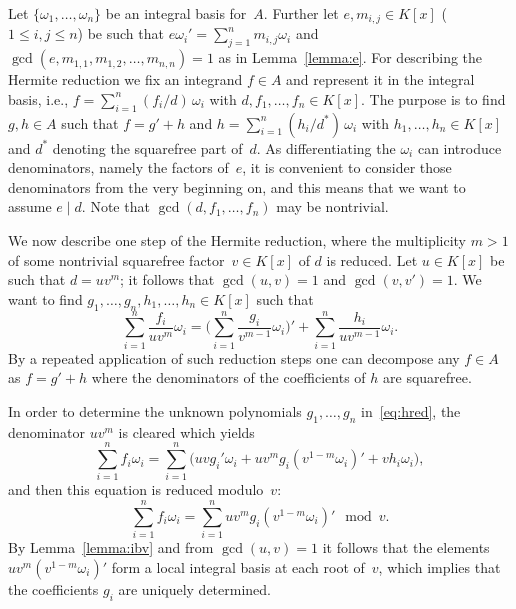 \documentclass{sig-alternate}
\begin{document}
Let $\{\omega_1,\ldots,\omega_n\}$ be an integral basis for~$A$.
Further let $e,m_{i,j}\in K[x]$ ($1\leq i,j\leq n$) be such that
$e\omega_i'=\sum_{j=1}^n m_{i,j}\omega_i$ and
$\gcd(e,m_{1,1},m_{1,2},\ldots,m_{n,n})=1$ as in Lemma~\ref{lemma:e}. For describing
the Hermite reduction we fix an integrand $f\in A$ and represent it in the
integral basis, i.e., $f=\sum_{i=1}^n (f_i/d)\,\omega_i$ with
$d,f_1,\ldots,f_n\in K[x]$. The purpose is to find $g,h\in A$ such that
$f=g'+h$ and $h=\sum_{i=1}^n(h_i/d^\ast)\,\omega_i$ with $h_1,\ldots,h_n\in K[x]$
and $d^\ast$ denoting the squarefree part of~$d$.
As differentiating the $\omega_i$ can introduce
denominators, name\-ly the factors of~$e$, it is convenient to consider those
denominators from the very beginning on, and this means that we want to assume
$e\mid d$. Note that $\gcd(d,f_1,\ldots,f_n)$ may be nontrivial.

We now describe one step of the Hermite reduction, where the multiplicity
$m>1$ of some nontrivial squarefree factor~$v\in K[x]$ of $d$ is reduced.
Let $u\in K[x]$ be such that $d=uv^m$; it follows that $\gcd(u,v)=1$ and
$\gcd(v,v')=1$. We want to find $g_1,\ldots,g_n,h_1,\ldots,h_n\in K[x]$
such that
\begin{equation}\label{eq:hred}
  \sum_{i=1}^n \frac{f_i}{uv^m}\omega_i =
  \biggl(\sum_{i=1}^n\frac{g_i}{v^{m-1}}\omega_i\biggr)' +
  \sum_{i=1}^n \frac{h_i}{uv^{m-1}}\omega_i.
\end{equation}
By a repeated application of such reduction steps one can decompose any $f\in A$
as $f=g'+h$ where the denominators of the coefficients of $h$ are squarefree.

In order to determine the unknown polynomials $g_1,\ldots,g_n$ in~\eqref{eq:hred},
the denominator $uv^m$ is cleared which yields
\begin{equation}\label{eq:clear}
  \sum_{i=1}^n f_i\omega_i = \sum_{i=1}^n \biggl( uvg_i'\omega_i +
  uv^mg_i\left(v^{1-m}\omega_i\right)' + vh_i\omega_i \biggr),
\end{equation}
and then this equation is reduced modulo~$v$:
\begin{equation}\label{eq:modv}
  \sum_{i=1}^n f_i\omega_i =
  \sum_{i=1}^n uv^mg_i\left(v^{1-m}\omega_i\right)' \mod v.
\end{equation}
By Lemma~\ref{lemma:ibv} and from $\gcd(u,v)=1$ it follows that
the elements $uv^m(v^{1-m}\omega_i)'$ form a local integral basis
at each root of~$v$, which implies that the coefficients $g_i$ are
uniquely determined.
\end{document}
